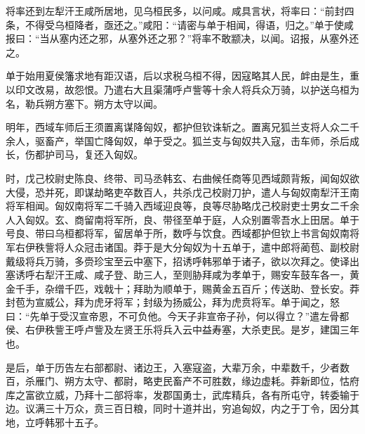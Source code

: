 \documentclass[12pt,UTF8]{ctexbook}
\begin{document}
将率还到左犁汗王咸所居地，见乌桓民多，以问咸。咸具言状，将率曰：“前封四条，不得受乌桓降者，亟还之。”咸阳：“请密与单于相闻，得语，归之。”单于使咸报曰：“当从塞内还之邪，从塞外还之邪？”将率不敢颛决，以闻。诏报，从塞外还之。



单于始用夏侯籓求地有距汉语，后以求税乌桓不得，因寇略其人民，衅由是生，重以印文改易，故怨恨。乃遣右大且渠蒲呼卢訾等十余人将兵众万骑，以护送乌桓为名，勒兵朔方塞下。朔方太守以闻。



明年，西域车师后王须置离谋降匈奴，都护但钦诛斩之。置离兄狐兰支将人众二千余人，驱畜产，举国亡降匈奴，单于受之。狐兰支与匈奴共入寇，击车师，杀后成长，伤都护司马，复还入匈奴。



时，戊己校尉史陈良、终带、司马丞韩玄、右曲候任商等见西域颇背叛，闻匈奴欲大侵，恐并死，即谋劫略吏卒数百人，共杀戊己校尉刀护，遣人与匈奴南犁汗王南将军相闻。匈奴南将军二千骑入西域迎良等，良等尽胁略戊己校尉吏士男女二千余人入匈奴。玄、商留南将军所，良、带径至单于庭，人众别置零吾水上田居。单于号良、带曰乌桓都将军，留居单于所，数呼与饮食。西域都护但钦上书言匈奴南将军右伊秩訾将人众冠击诸国。莽于是大分匈奴为十五单于，遣中郎将蔺苞、副校尉戴级将兵万骑，多赍珍宝至云中塞下，招诱呼韩邪单于诸子，欲以次拜之。使译出塞诱呼右犁汗王咸、咸子登、助三人，至则胁拜咸为孝单于，赐安车鼓车各一，黄金千手，杂缯千匹，戏戟十；拜助为顺单于，赐黄金五百斤；传送助、登长安。莽封苞为宣威公，拜为虎牙将军；封级为扬威公，拜为虎贲将军。单于闻之，怒曰：“先单于受汉宣帝恩，不可负他。今天子非宣帝子孙，何以得立？”遣左骨都侯、右伊秩訾王呼卢訾及左贤王乐将兵入云中益寿塞，大杀吏民。是岁，建国三年也。



是后，单于历告左右部都尉、诸边王，入塞寇盗，大辈万余，中辈数千，少者数百，杀雁门、朔方太守、都尉，略吏民畜产不可胜数，缘边虚耗。莽新即位，怙府库之富欲立威，乃拜十二部将率，发郡国勇士，武库精兵，各有所屯守，转委输于边。议满三十万众，贲三百日粮，同时十道并出，穷追匈奴，内之于丁令，因分其地，立呼韩邪十五子。
\end{document}
